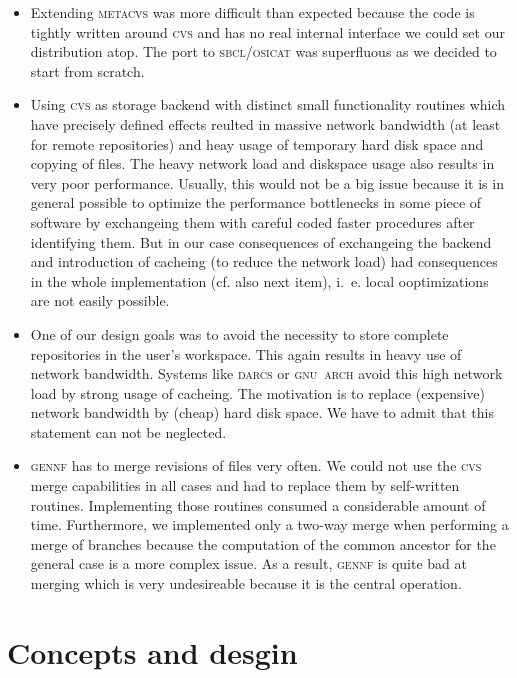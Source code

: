\documentclass[fleqn, 10pt, a4paper]{report} \usepackage{amssymb}
\newcommand{\GENNF}{\textsc{gennf}}
\begin{document}
\begin{itemize}
\item Extending \textsc{metacvs} was more difficult than expected
  because the code is tightly written around \textsc{cvs} and has no
  real internal interface we could set our distribution atop.  The
  port to \textsc{sbcl}/\textsc{osicat} was superfluous as we decided
  to start from scratch.
\item Using \textsc{cvs} as storage backend with distinct small
  functionality routines which have precisely defined effects reulted
  in massive network bandwidth (at least for remote repositories) and
  heay usage of temporary hard disk space and copying of files.
  The heavy network load and diskspace usage also results in very poor
  performance. Usually, this would not be a big issue because it is in
  general possible to optimize the performance bottlenecks in some
  piece of software by exchangeing them with careful coded faster
  procedures after identifying them. But in our case consequences of
  exchangeing the backend and introduction of cacheing (to reduce the
  network load) had consequences in the whole implementation (cf. also
  next item), i.~e. local ooptimizations are not easily possible.
\item One of our design goals was to avoid the necessity to store
  complete repositories in the user's workspace. This again results in
  heavy use of network bandwidth. Systems like \textsc{darcs} or
  \textsc{gnu~arch} avoid this high network load by strong usage of
  cacheing. The motivation is to replace (expensive) network bandwidth
  by (cheap) hard disk space. We have to admit that this statement
  can not be neglected.
\item \GENNF{} has to merge revisions of files very often. We could
  not use the \textsc{cvs} merge capabilities in all cases and had to
  replace them by self-written routines. Implementing those routines
  consumed a considerable amount of time. Furthermore, we implemented
  only a two-way merge when performing a merge of branches because the
  computation of the common ancestor for the general case is a more
  complex issue. As a result, \GENNF{} is quite bad at merging which
  is very undesireable because it is the central operation.
\end{itemize}


\chapter{Concepts and desgin}
\end{document}
